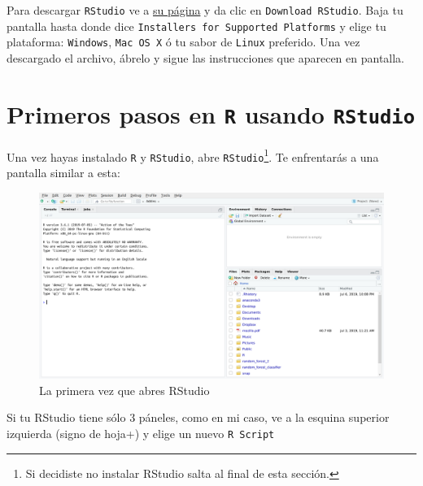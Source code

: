 \documentclass[
]{book}
\begin{document}
Para descargar \texttt{RStudio} ve a \href{https://www.rstudio.com}{su página} y da clic en \texttt{Download\ RStudio}. Baja tu pantalla hasta donde dice \texttt{Installers\ for\ Supported\ Platforms} y elige tu plataforma: \texttt{Windows}, \texttt{Mac\ OS\ X} ó tu sabor de \texttt{Linux} preferido. Una vez descargado el archivo, ábrelo y sigue las instrucciones que aparecen en pantalla.

\hypertarget{primeros-pasos-en-r-usando-rstudio}{%
\section{\texorpdfstring{Primeros pasos en \texttt{R} usando \texttt{RStudio}}{Primeros pasos en R usando RStudio}}\label{primeros-pasos-en-r-usando-rstudio}}

Una vez hayas instalado \texttt{R} y \texttt{RStudio}, abre \texttt{RStudio}\footnote{Si decidiste no instalar RStudio salta al final de esta sección.}. Te enfrentarás a una pantalla similar a esta:

\begin{figure}

{\centering \includegraphics[width=40in]{images/RStudio1} 

}

\caption{La primera vez que abres RStudio}\label{fig:fig-main}
\end{figure}

Si tu RStudio tiene sólo 3 páneles, como en mi caso, ve a la esquina superior izquierda (signo de hoja+) y elige un nuevo \texttt{R\ Script}
\end{document}

